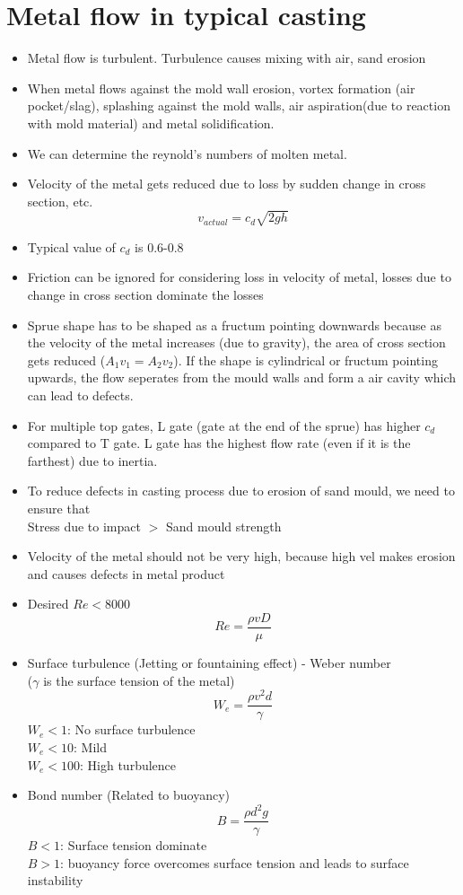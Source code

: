 \documentclass{article}
\begin{document}
\section{Metal flow in typical casting}
\begin{itemize}
	\item Metal flow is turbulent. Turbulence causes mixing with air, sand erosion	
	\item When metal flows against the mold wall erosion, vortex formation (air pocket/slag), splashing against the mold walls, air aspiration(due to reaction with mold material) and metal solidification.
	\item We can determine the reynold's numbers of molten metal.
	\item Velocity of the metal gets reduced due to loss by sudden change in cross section, etc.
		\[v_{actual}=c_d \sqrt{2gh}\]
	\item Typical value of $c_d$ is 0.6-0.8
	\item Friction can be ignored for considering loss in velocity of metal, losses due to change in cross section dominate the losses
	\item Sprue shape has to be shaped as a fructum pointing downwards because as the velocity of the metal increases (due to gravity), the area of cross section gets reduced ($A_1 v_1 = A_2 v_2$). If the shape is cylindrical or fructum pointing upwards, the flow seperates from the mould walls and form a air cavity which can lead to defects. 
	\item For multiple top gates, L gate (gate at the end of the sprue) has higher $c_d$ compared to T gate. L gate has the highest flow rate (even if it is the farthest) due to inertia.
	\item To reduce defects in casting process due to erosion of sand mould, we need to ensure that \\
	Stress due to impact $>$ Sand mould strength
	\item Velocity of the metal should not be very high, because high vel makes erosion and causes defects in metal product
	\item Desired $Re <8000$
	\[Re = \frac{\rho v D}{\mu}\]

	\item Surface turbulence (Jetting or fountaining effect) - Weber number \\
	($\gamma$ is the surface tension of the metal)
	\[W_e = \frac{\rho v^2 d}{\gamma}\]
	$W_e <1$: No surface turbulence\\
	$W_e <10$: Mild \\
	$W_e <100$: High turbulence

	\item Bond number (Related to buoyancy)
	\[B = \frac{\rho d^2 g}{\gamma}\]
	$B <1$: Surface tension dominate\\
	$B>1$: buoyancy force overcomes surface tension and leads to surface instability
\end{itemize}
\end{document}
